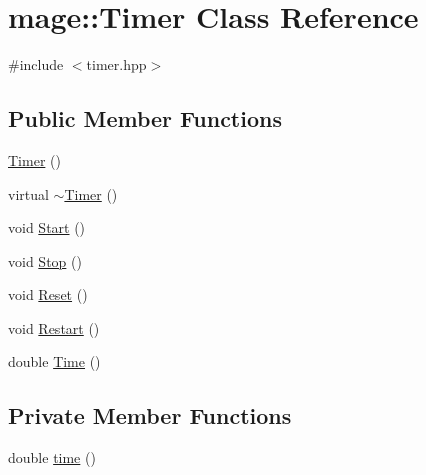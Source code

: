 \hypertarget{classmage_1_1_timer}{}\section{mage\+:\+:Timer Class Reference}
\label{classmage_1_1_timer}


{\ttfamily \#include $<$timer.\+hpp$>$}

\subsection*{Public Member Functions}
\begin{DoxyCompactItemize}
\item 
\hyperlink{classmage_1_1_timer_a5e1c0a3bb4491b3a43ce05874ad24055}{Timer} ()
\item 
virtual \hyperlink{classmage_1_1_timer_aa91cebe8c59c189fde93932fde10265c}{$\sim$\+Timer} ()
\item 
void \hyperlink{classmage_1_1_timer_a5855c9df8ad1a2b6774942e566833647}{Start} ()
\item 
void \hyperlink{classmage_1_1_timer_abf234f1e2ee9e760f316bd49500d5a3a}{Stop} ()
\item 
void \hyperlink{classmage_1_1_timer_a0675ff7bc0a8e7343b5a35f865cc9c1a}{Reset} ()
\item 
void \hyperlink{classmage_1_1_timer_a4e1ba19d02c290a18981db1766f006c3}{Restart} ()
\item 
double \hyperlink{classmage_1_1_timer_a5e4655ac296cc8971b54e5a76082f00f}{Time} ()
\end{DoxyCompactItemize}
\subsection*{Private Member Functions}
\begin{DoxyCompactItemize}
\item 
double \hyperlink{classmage_1_1_timer_a782882e9dbe9a2843b5203ba13309b23}{time} ()
\end{DoxyCompactItemize}
